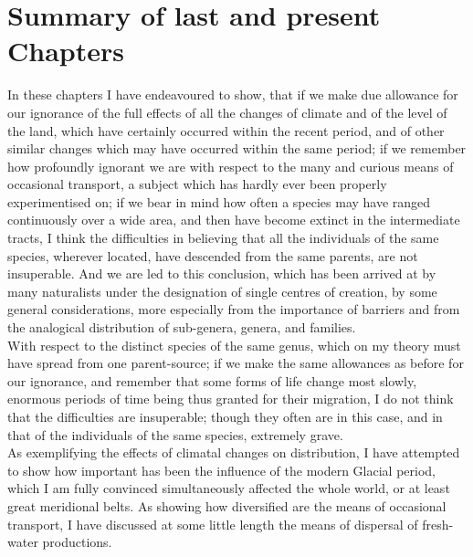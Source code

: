 \section{Summary of last and present Chapters}
\indent In these chapters I have endeavoured to show, that if we make due allowance for our ignorance of the full effects of all the changes of climate and of the level of the land, which have certainly occurred within the recent period, and of other similar changes which may have occurred within the same period; if we remember how profoundly ignorant we are with respect to the many and curious means of occasional transport, a subject which has hardly ever been properly experimentised on; if we bear in mind how often a species may have ranged continuously over a wide area, and then have become extinct in the intermediate tracts, I think the difficulties in believing that all the individuals of the same species, wherever located, have descended from the same parents, are not insuperable.  And we are led to this conclusion, which has been arrived at by many naturalists under the designation of single centres of creation, by some general considerations, more especially from the importance of barriers and from the analogical distribution of sub-genera, genera, and families.~\\
\indent With respect to the distinct species of the same genus, which on my theory must have spread from one parent-source; if we make the same allowances as before for our ignorance, and remember that some forms of life change most slowly, enormous periods of time being thus granted for their migration, I do not think that the difficulties are insuperable; though they often are in this case, and in that of the individuals of the same species, extremely grave.~\\
\indent As exemplifying the effects of climatal changes on distribution, I have attempted to show how important has been the influence of the modern Glacial period, which I am fully convinced simultaneously affected the whole world, or at least great meridional belts. As showing how diversified are the means of occasional transport, I have discussed at some little length the means of dispersal of fresh-water productions.~\\
